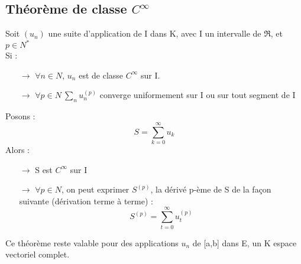 \subsection{Théorème de classe $C^{\infty}$}
\begin{theo}
Soit $(u_n)$ une suite d'application de I dans K, avec I un intervalle de $\Re$, et $p\in N^*$\\
Si : \\
\begin{itemize}
 \item[$\rightarrow$] $\forall n \in N$, $u_n$ est de classe $C^{\infty}$ sur I.\\
 \item[$\rightarrow$] $\forall p \in N~ \underset{n} \sum u^{(p)}_n$ converge uniformement sur I ou sur tout segment de I\\
\end{itemize}
Posons :
$$S = \sum_{k=0}^{\infty} u_k$$
Alors :\\
\begin{itemize}
 \item[$\rightarrow$] S est $C^{\infty}$ sur I\\
 \item[$\rightarrow$] $\forall p \in N$, on peut exprimer $S^{(p)}$, la dérivé p-ème de S de la façon suivante (dérivation terme à terme) : 
 $$S^{(p)} = \sum_{t=0}^{\infty} u^{(p)}_t$$
\end{itemize}
\end{theo}
\begin{gene}
Ce théorème reste valable pour des applications $u_n$ de [a,b] dans E, un K espace vectoriel complet.
\end{gene}
